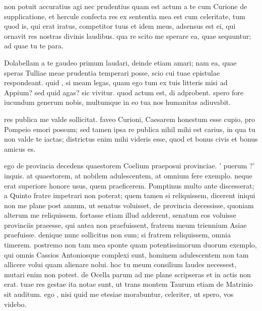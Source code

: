 


 non potuit accuratius agi nec prudentius quam est actum a te cum Curione de supplicatione, et hercule confecta res ex sententia mea est cum celeritate, tum quod is, qui erat iratus, competitor tuus et idem meus, adsensus est ei, qui ornavit res nostras divinis laudibus. qua re scito me sperare ea, quae sequuntur; ad quae tu te para.

 Dolabellam a te gaudeo primum laudari, deinde etiam amari; nam ea, quae speras Tulliae meae prudentia temperari posse, scio cui tuae epistulae respondeant. quid , si meam legas, quam ego tum ex tuis litteris misi ad Appium? sed quid agas? sic vivitur. quod actum est, di adprobent. spero fore iucundum generum nobis, multumque in eo tua nos humanitas adiuvabit.

 res publica me valde sollicitat. faveo Curioni, Caesarem honestum esse cupio, pro Pompeio emori possum; sed tamen ipsa re publica nihil mihi est carius, in qua tu non valde te iactas; districtus enim mihi videris esse, quod et bonus civis et bonus amicus es.

 ego de provincia decedens quaestorem Coelium praeposui provinciae. ' puerum ?' inquis. at quaestorem, at nobilem adulescentem, at omnium fere exemplo. neque erat superiore honore usus, quem praeficerem. Pomptinus multo ante discesserat; a Quinto fratre impetrari non poterat; quem tamen si reliquissem, dicerent iniqui non me plane post annum, ut senatus voluisset, de provincia decessisse, quoniam alterum me reliquissem. fortasse etiam illud adderent, senatum eos voluisse provinciis praeesse, qui antea non praefuissent, fratrem meum triennium Asiae praefuisse. denique nunc sollicitus non sum; si fratrem reliquissem, omnia timerem. postremo non tam mea sponte quam potentissimorum duorum exemplo, qui omnis Cassios Antoniosque complexi sunt, hominem adulescentem non tam allicere volui quam alienare nolui. hoc tu meum consilium laudes necessest, mutari enim non potest. de Ocella parum ad me plane scripseras et in actis non erat. tuae res gestae ita notae sunt, ut trans montem Taurum etiam de Matrinio sit auditum. ego , nisi quid me etesiae morabuntur, celeriter, ut spero, vos videbo.
